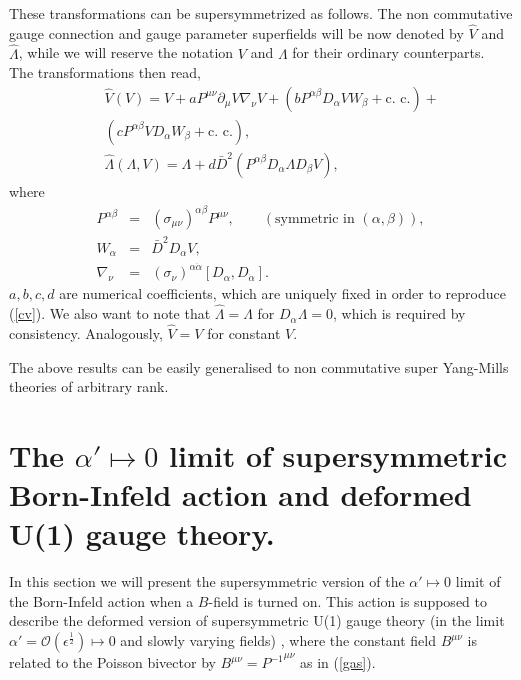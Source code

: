 \documentclass[a4paper,12pt]{article}
\begin{document}
These transformations can be supersymmetrized as follows. The  non
commutative  gauge connection 
and gauge parameter superfields will be now denoted by $\hat V$ and $\hat
\Lambda$, while we 
will reserve the notation $V$ and $\Lambda$ for their ordinary
counterparts.
The transformations then read,
\begin{eqnarray}
&&\hat V(V)=V +aP^{\mu\nu}\partial_\mu V\nabla_\nu V + (b
P^{\alpha\beta}D_\alpha VW_\beta +
 \mbox{c. c.}) +\nonumber\\
&&(c P^{\alpha\beta}VD_\alpha W_\beta + \mbox{c. c.}),\nonumber\\
&& \hat\Lambda(\Lambda, V)= \Lambda +d{\bar D}^2(P^{\alpha\beta}D_\alpha
\Lambda D_\beta V),
\label{scv}
\end{eqnarray}
where 
\begin{eqnarray*}
P^{\alpha \beta}&=&(\sigma_{\mu\nu})^{\alpha\beta}P^{\mu\nu}, \qquad
(\mbox{symmetric in }(\alpha,\beta)),\\
  W_\alpha&=&{\bar D}^2D_\alpha V,\\
\nabla_\nu&=&(\sigma_\nu)^{\alpha\dot\alpha}[D_\alpha,D_{\dot\alpha}].
\end{eqnarray*}
$a,b,c,d$ are numerical coefficients, which are uniquely fixed in order to
reproduce (\ref{cv}).
We also want to note that $\hat \Lambda=\Lambda $ for
$D_\alpha\Lambda=0$, which is required
by consistency. Analogously, $\hat V=V$ for constant $V$.

 The above results can be easily generalised to non commutative super
Yang-Mills theories of 
arbitrary rank. 


\section{The $\alpha'\mapsto 0$ limit of supersymmetric Born-Infeld action
and deformed
 U(1) gauge theory.}

In this section we will present the supersymmetric version of the
$\alpha'\mapsto 0 $
 limit of the Born-Infeld action when a $B$-field is turned on. This
action is supposed 
to describe the deformed version of supersymmetric U(1) gauge theory (in
the limit
 $\alpha'=\mathcal{O}(\epsilon^\frac{1}{2})\mapsto 0$ and slowly varying
fields) \cite{sw},  where the 
constant field $B^{\mu\nu}$ is related to the Poisson bivector by 
$B^{\mu\nu}={P^{-1}}^{\mu\nu}$ as in (\ref{gas}).
\end{document}
